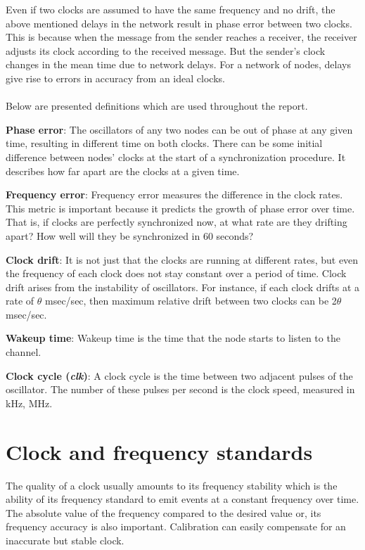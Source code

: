 \documentclass[a4paper,10pt]{report}
\begin{document}
Even if two clocks are assumed to have the same frequency and no drift, the above mentioned delays in the network result in phase
error between two clocks. This is because when the message from the sender reaches a receiver, the receiver adjusts its clock according to the received message. But the sender's clock changes in the mean time due to network delays. For a network of nodes, delays give rise to errors in accuracy from an ideal clocks. \paragraph*{} \noindent
     Below are presented definitions which are used throughout the report.
\begin{description}
\item \textbf{Phase error}: The oscillators of any two nodes can be out of phase at any given time, resulting in different time on both clocks. There can be some initial difference between nodes' clocks at the start of a synchronization procedure. It describes how far apart are the clocks at a given time.
\item \textbf{Frequency error}: Frequency error measures the difference in the clock rates. This metric is important because it predicts the growth of phase error over time. That is, if clocks are perfectly synchronized now, at what rate are they drifting apart? How well will they be synchronized in 60 seconds?
\item \textbf{Clock drift}: It is not just that the clocks are running at different rates, but even the frequency of each clock does not stay constant over a period of time. Clock drift arises from the instability of oscillators. For instance, if each clock drifts at a rate of $\theta$ msec/sec, then maximum relative drift between two clocks can be 2$\theta$ msec/sec.
\item \textbf{Wakeup time}: Wakeup time  is the time that the node starts to listen to the channel.
\item \textbf{Clock cycle (\textit{clk})}: A clock cycle  is the time between two adjacent pulses of the oscillator. The number of these pulses per second is the clock speed, measured in kHz, MHz.
\end{description}
\section{\textbf{Clock and frequency standards}}\par
The quality of a clock usually amounts to its frequency stability which is the ability of its frequency standard to emit
events at a constant frequency over time. The absolute value of the frequency compared to the desired value or, its frequency accuracy
is also important. Calibration can easily compensate for an inaccurate but stable clock.
\end{document}
